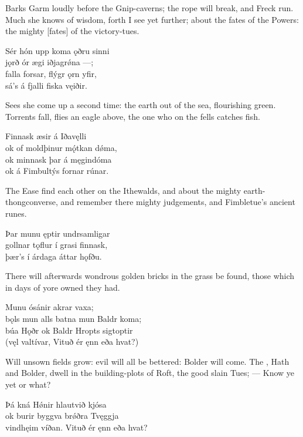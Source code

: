\bvb Barks Garm loudly before the Gnip-caverns; the rope will break, and Freck run. Much she knows of wisdom, forth I see yet further; about the fates of the Powers: the mighty [fates] of the victory-tues.\evb

\bva Sér hón upp koma \hld ǫðru sinni \\%
jǫrð ór ægi \hld iðjagrǿna —; \\%
falla forsar, \hld flýgr ǫrn yfir, \\%
sá’s á fjalli \hld fiska vęiðir.\eva

\bvb Sees she come up a second time: the earth out of the sea, flourishing green. Torrents fall, flies an eagle above, the one who on the fells catches fish.\evb

\bva Finnask æsir \hld á Iðavęlli \\%
ok of moldþinur \hld mǫ́tkan dǿma, \\%
ok minnask þar \hld á męgindóma \\%
ok á Fimbultýs \hld fornar rúnar.\eva

\bvb The Ease find each other on the Ithewalds, and about the mighty earth-thong\footnotemark[1] converse, and remember there mighty judgements, and Fimbletue’s ancient runes.\evb
{}

\bva Þar munu ęptir \hld undrsamligar \\%
gollnar tǫflur \hld í grasi finnask, \\%
þær’s í árdaga \hld áttar hǫfðu.\eva

\bvb There will afterwards wondrous golden bricks in the grass be found, those which in days of yore owned they had.\evb

\bva Munu ósánir \hld akrar vaxa; \\%
bǫls mun alls batna \hld mun Baldr koma; \\%
búa Hǫðr ok Baldr \hld Hropts sigtoptir \\%
(vęl valtívar, \hld Vituð ér ęnn eða hvat?)\eva

\bvb Will unsown fields grow: evil will all be bettered: Bolder will come. The , Hath and Bolder, dwell in the building-plots of Roft, the good slain Tues\footnotemark[1]; — Know ye yet or what?\evb
{}

\bva Þá kná Hǿnir \hld hlautvið kjósa \\%
ok burir byggva \hld brǿðra Tvęggja \\%
vindhęim víðan. \hld Vituð ér ęnn eða hvat?\eva

